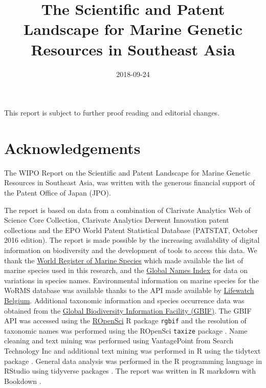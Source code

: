 \documentclass[]{book}
\title{The Scientific and Patent Landscape for Marine Genetic Resources in
Southeast Asia}
\date{2018-09-24}
\theoremstyle{definition}
\theoremstyle{definition}
\theoremstyle{definition}
\theoremstyle{remark}
\begin{document}
\maketitle

{
\setcounter{tocdepth}{1}
\tableofcontents
}
\hypertarget{section}{%
\chapter*{}\label{section}}

This report is subject to further proof reading and editorial changes.

\hypertarget{acknowledgements}{%
\chapter*{Acknowledgements}\label{acknowledgements}}

The WIPO Report on the Scientific and Patent Landscape for Marine
Genetic Resources in Southeast Asia, was written with the generous
financial support of the Patent Office of Japan (JPO).

The report is based on data from a combination of Clarivate Analytics
Web of Science Core Collection, Clarivate Analytics Derwent Innovation
patent collections and the EPO World Patent Statistical Database
(PATSTAT, October 2016 edition). The report is made possible by the
increasing availability of digital information on biodiversity and the
development of tools to access this data. We thank the
\href{http://www.marinespecies.org/}{World Register of Marine Species}
which made available the list of marine species used in this research,
and the \href{http://gni.globalnames.org/}{Global Names Index} for data
on variations in species names. Environmental information on marine
species for the WoRMS database was available thanks to the API made
available by
\href{http://www.lifewatch.be/data-services/?cache=1521050271}{Lifewatch
Belgium}. Additional taxonomic information and species occurrence data
was obtained from the \href{https://www.gbif.org/}{Global Biodiversity
Information Facility (GBIF)}. The GBIF API was accessed using the
\href{https://ropensci.org/}{ROpenSci} R package \texttt{rgbif} and the
resolution of taxonomic names was performed using the ROpenSci
\texttt{taxize} package \citep{R-rgbif, R-taxize}. Name cleaning and
text mining was performed using VantagePoint from Search Technology Inc
and additional text mining was performed in R using the tidytext package
\citep{R-tidytext}. General data analysis was performed in the R
programming language in RStudio using tidyverse packages
\citep{R-base, R-tidyverse}. The report was written in R markdown with
Bookdown \citep{R-rmarkdown, R-bookdown}.
\end{document}
